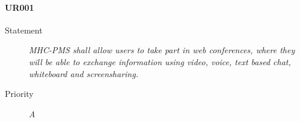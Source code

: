 \paragraph{UR001}
\begin{description}
  \item [Statement] 
    \textit{\gls{MHC-PMS} shall allow users to take part in web conferences, where they will be able to exchange information using video, voice, text based chat, whiteboard and screensharing.}
  \item [Priority] \textit{A}
\end{description}

